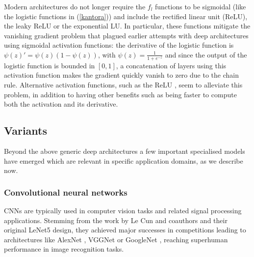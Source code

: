 Modern architectures do not longer require the
$f_l$ functions to be sigmoidal (like the  
logistic functions in (\ref{kantora})) and include  
the rectified linear unit (ReLU), the leaky ReLU
or the exponential LU. In particular, these functions mitigate the vanishing gradient problem \cite{kolen2001gradient} that 
plagued earlier attempts with deep architectures using sigmoidal
activation functions: the derivative of the logistic function is $\psi(z)' = \psi(z)(1 - \psi(z))$, with $\psi(z) = \frac{1}{1 + e^{-z}}$ and since the output of the logistic function is bounded in $\left[ 0, 1 \right]$, a concatenation of layers using this activation function makes the gradient quickly vanish to zero due to the chain rule. Alternative activation functions, such as the ReLU \cite{glorot2010understanding}, seem to alleviate this problem, in addition to having other benefits such as being faster to compute both the activation and its derivative.

\subsection{Variants} 
Beyond the above generic deep architectures 
a few important specialised models have emerged which 
are relevant in specific application domains,
as we describe now. 
\subsubsection{Convolutional neural networks} 
CNNs are typically used 
 in computer vision tasks and related signal processing applications.
 Stemming from the work by Le Cun and coauthors  
  \cite{lecun89, lecun98} and their original 
  LeNet5 design, they achieved major
 successes  in  competitions \cite{krizhevsky2017imagenet}
 leading to architectures like 
 AlexNet       \cite{NIPS2012_c399862d}, VGGNet \cite{simonyan2014very} or
 GoogleNet \cite{szegedy2015going}, reaching 
 superhuman performance in 
 image recognition tasks.
 
